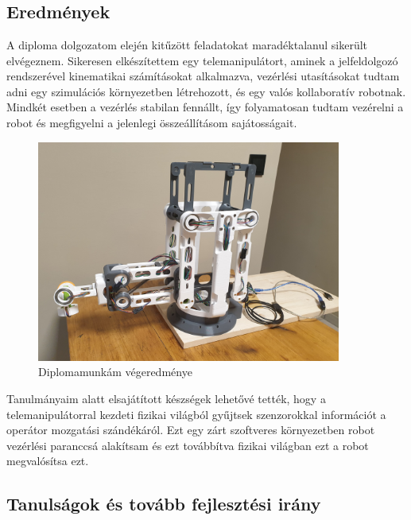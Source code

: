 \chapter{\osszefoglalas}

\section{Eredmények}

A diploma dolgozatom elején kitűzött feladatokat maradéktalanul sikerült elvégeznem. Sikeresen elkészítettem egy telemanipulátort, aminek a jelfeldolgozó rendszerével kinematikai számításokat alkalmazva, vezérlési utasításokat tudtam adni egy szimulációs környezetben létrehozott, és egy valós kollaboratív robotnak. Mindkét esetben a vezérlés stabilan fennállt, így folyamatosan tudtam vezérelni a robot és megfigyelni a jelenlegi összeállításom sajátosságait.

\begin{figure}[!ht]
\centering
\includegraphics[width=100mm, keepaspectratio]{figures/Szumma/Keszeszkoz}
\caption{Diplomamunkám végeredménye}
\label{fig:Diploma_ending}
\end{figure}

Tanulmányaim alatt elsajátított készségek lehetővé tették, hogy a telemanipulátorral kezdeti fizikai világból gyűjtsek szenzorokkal információt a operátor mozgatási szándékáról. Ezt egy zárt szoftveres környezetben robot vezérlési paranccsá alakítsam és ezt továbbítva fizikai világban ezt a robot megvalósítsa ezt.


\section{Tanulságok és tovább fejlesztési irány} 

